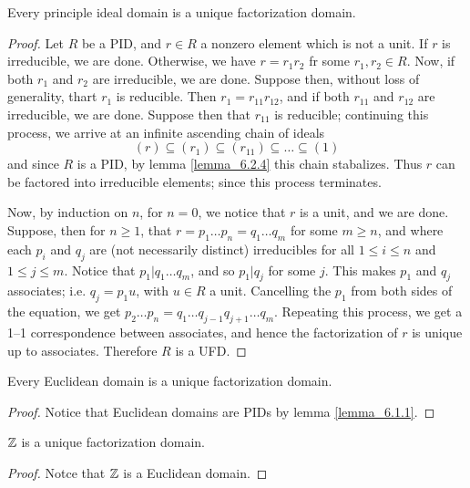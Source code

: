 \begin{theorem}\label{lemma_6.3.5}
  Every principle ideal domain is a unique factorization domain.
\end{theorem}
\begin{proof}
  Let $R$ be a PID, and  $r \in R$ a nonzero element which is not a unit. If
  $r$ is irreducible, we are done. Otherwise, we have  $r=r_1r_2$ fr some
  $r_1,r_2 \in R$. Now, if both $r_1$ and $r_2$ are irreducible, we are done.
  Suppose then, without loss of generality, thart $r_1$ is reducible. Then
  $r_1=r_{11}r_{12}$, and if both $r_{11}$ and $r_{12}$ are irreducible, we
  are done. Suppose then that $r_{11}$ is reducible; continuing this process,
  we arrive at an infinite ascending chain of ideals
  \begin{equation*}
    (r) \subseteq (r_1) \subseteq (r_{11}) \subseteq \dots \subseteq (1)
  \end{equation*}
  and since $R$ is a PID, by lemma \ref{lemma_6.2.4} this chain stabalizes. Thus
  $r$ can be factored into irreducible elements; since this process terminates.

  Now, by induction on $n$, for  $n=0$, we notice that  $r$ is a unit, and we
  are done. Suppose, then for  $n \geq 1$, that  $r=p_1 \dots p_n=q_1 \dots
  q_m$ for some $m \geq n$, and where each  $p_i$ and  $q_j$ are  (not
  necessarily distinct) irreducibles for all $1 \leq i \leq n$ and $1 \leq j
  \leq m$. Notice that  $p_1|q_1 \dots q_m$, and so $p_1|q_j$ for some $j$.
  This makes  $p_1$ and $q_j$ associates; i.e.  $q_j=p_1u$, with $u \in R$ a
  unit. Cancelling the  $p_1$ from both sides of the equation, we get $p_2
  \dots p_n=q_1 \dots q_{j-1}q_{j+1} \dots q_m$. Repeating this process, we
  get a 1--1 correspondence between associates, and hence the factorization of
  $r$ is unique up to associates. Therefore  $R$ is a UFD.
\end{proof}
\begin{corollary}
  Every Euclidean domain is a unique factorization domain.
\end{corollary}
\begin{proof}
  Notice that Euclidean domains are PIDs by lemma \ref{lemma_6.1.1}.
\end{proof}
\begin{corollary}
  $\mathbb{Z}$ is a unique factorization domain.
\end{corollary}
\begin{proof}
  Notce that $\mathbb{Z}$ is a Euclidean domain.
\end{proof}
